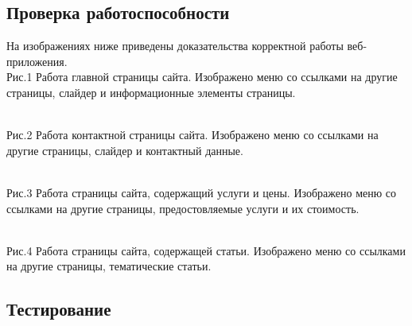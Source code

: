 \subsection{\normalsize Проверка работоспособности}
\hspace{1.25cm}
На изображениях ниже приведены доказательства корректной   работы веб-приложения.
\\
Рис.1 Работа главной страницы сайта.
Изображено меню со ссылками на другие страницы, слайдер и информационные элементы страницы.

\\
Рис.2 Работа контактной страницы сайта.
Изображено меню со ссылками на другие страницы, слайдер и контактный данные.

\\
Рис.3 Работа страницы сайта, содержащий услуги и цены.
Изображено меню со ссылками на другие страницы, предостовляемые услуги и их стоимость.


\\
Рис.4  Работа страницы сайта, содержащей статьи.
Изображено меню со ссылками на другие страницы, тематические статьи.
\subsection{\normalsize Тестирование}
\hspace{1.25cm}
